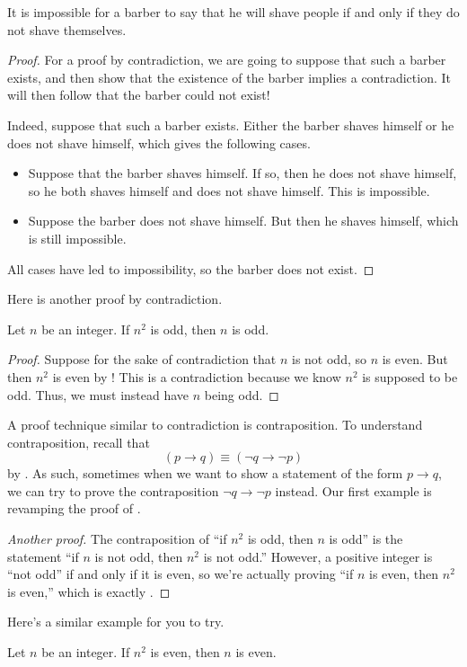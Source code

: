 \documentclass[../main.tex]{subfiles}
\begin{document}
\begin{example} \label{exe:barber-diagonalization} %
    It is impossible for a barber to say that he will shave people if and only if they do not shave themselves.
\end{example}
\begin{proof}
    For a proof by contradiction, we are going to suppose that such a barber exists, and then show that the existence of the barber implies a contradiction. It will then follow that the barber could not exist!
    
    Indeed, suppose that such a barber exists. Either the barber shaves himself or he does not shave himself, which gives the following cases.
    \begin{itemize}
        \item Suppose that the barber shaves himself. If so, then he does not shave himself, so he both shaves himself and does not shave himself. This is impossible.
        \item Suppose the barber does not shave himself. But then he shaves himself, which is still impossible.
    \end{itemize}
    All cases have led to impossibility, so the barber does not exist.
\end{proof}
Here is another proof by contradiction.
\begin{example} \label{exe:odd-square-to-odd}
    Let $n$ be an integer. If $n^2$ is odd, then $n$ is odd.
\end{example}
\begin{proof}
    Suppose for the sake of contradiction that $n$ is not odd, so $n$ is even. But then $n^2$ is even by ! This is a contradiction because we know $n^2$ is supposed to be odd. Thus, we must instead have $n$ being odd.
\end{proof}
A proof technique similar to contradiction is contraposition. To understand contraposition, recall that
\[(p\to q)\equiv(\lnot q\to\lnot p)\]
by . As such, sometimes when we want to show a statement of the form $p\to q$, we can try to prove the contraposition $\lnot q\to\lnot p$ instead. Our first example is revamping the proof of .
\begin{proof}[Another proof]
    The contraposition of ``if $n^2$ is odd, then $n$ is odd'' is the statement ``if $n$ is not odd, then $n^2$ is not odd.'' However, a positive integer is ``not odd'' if and only if it is even, so we're actually proving ``if $n$ is even, then $n^2$ is even,'' which is exactly .
\end{proof}
Here's a similar example for you to try.
\begin{exe}
    Let $n$ be an integer. If $n^2$ is even, then $n$ is even.
\end{exe}
\end{document}
